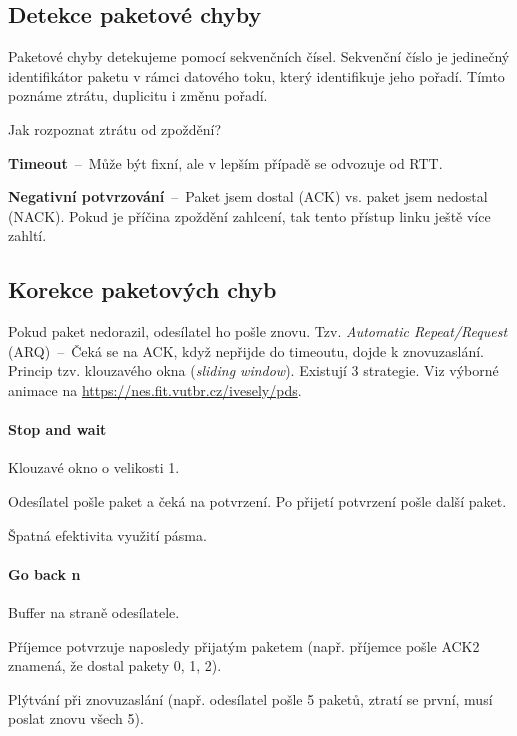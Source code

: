 \subsection{Detekce paketové chyby}

Paketové chyby detekujeme pomocí sekvenčních čísel. Sekvenční číslo je jedinečný identifikátor paketu v rámci datového toku, který identifikuje jeho pořadí. Tímto poznáme ztrátu, duplicitu i změnu pořadí.

\medskip\noindent Jak rozpoznat ztrátu od zpoždění? \begin{compactitem}
    \item \textbf{Timeout}~--~Může být fixní, ale v lepším případě se odvozuje od RTT.
    \item \textbf{Negativní potvrzování}~--~Paket jsem dostal (ACK) vs. paket jsem nedostal (NACK). Pokud je příčina zpoždění zahlcení, tak tento přístup linku ještě více zahltí.
\end{compactitem}

\subsection{Korekce paketových chyb}

Pokud paket nedorazil, odesílatel ho pošle znovu. Tzv. \textit{Automatic Repeat/Request} (ARQ)~--~Čeká se na ACK, když nepřijde do timeoutu, dojde k znovuzaslání. Princip tzv. klouzavého okna (\textit{sliding window}). Existují 3 strategie. Viz výborné animace na \url{https://nes.fit.vutbr.cz/ivesely/pds}.

\paragraph*{Stop and wait} \begin{compactitem}
    \item Klouzavé okno o velikosti 1.
    \item Odesílatel pošle paket a čeká na potvrzení. Po přijetí potvrzení pošle další paket.
    \item Špatná efektivita využití pásma.
\end{compactitem}

\paragraph*{Go back n} \begin{compactitem}
    \item Buffer na straně odesílatele.
    \item Příjemce potvrzuje naposledy přijatým paketem (např. příjemce pošle ACK2 znamená, že dostal pakety 0, 1, 2).
    \item Plýtvání při znovuzaslání (např. odesílatel pošle 5 paketů, ztratí se první, musí poslat znovu všech 5).
\end{compactitem}

